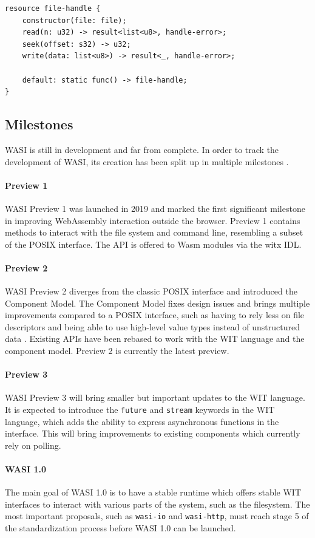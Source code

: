  
\begin{lstlisting}[language=wit]
resource file-handle {
    constructor(file: file);
    read(n: u32) -> result<list<u8>, handle-error>;
    seek(offset: s32) -> u32;
    write(data: list<u8>) -> result<_, handle-error>;
    
    default: static func() -> file-handle;
}
\end{lstlisting}


\subsection{Milestones}
\acrshort{WASI} is still in development and far from complete. In order to track the development of WASI, its creation has been split up in multiple milestones \cite{wasi_milestones}.

\paragraph{Preview 1}
\acrshort{WASI} Preview 1 was launched in 2019 and marked the first significant milestone in improving WebAssembly interaction outside the browser. Preview 1 contains methods to interact with the file system and command line, resembling a subset of the \acrfull{POSIX} interface. The API is offered to \acrshort{Wasm} modules via the witx \acrfull{IDL}.

\paragraph{Preview 2}
\acrshort{WASI} Preview 2 diverges from the classic \acrshort{POSIX} interface and introduced the Component Model. The Component Model fixes design issues and brings multiple improvements compared to a \acrshort{POSIX} interface, such as having to rely less on file descriptors and being able to use high-level value types instead of unstructured data \cite{path_to_components}. Existing APIs have been rebased to work with the \acrshort{WIT} language and the component model. Preview 2 is currently the latest preview.

\paragraph{Preview 3}
\acrshort{WASI} Preview 3 will bring smaller but important updates to the \acrshort{WIT} language. It is expected to introduce the \texttt{future} and \texttt{stream} keywords in the \acrshort{WIT} language, which adds the ability to express asynchronous functions in the interface. This will bring improvements to existing components which currently rely on polling.

\paragraph{WASI 1.0}
The main goal of \acrshort{WASI} 1.0 is to have a stable runtime which offers stable WIT interfaces to interact with various parts of the system, such as the filesystem. The most important proposals, such as \texttt{wasi-io} and \texttt{wasi-http}, must reach stage 5 of the standardization process \cite{proposal_phases} before WASI 1.0 can be launched. 